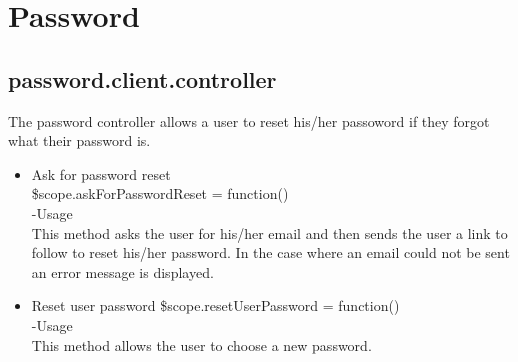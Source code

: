 \documentclass[a4paper,12pt]{article}
\begin{document}
 \section{Password}
 \subsection{password.client.controller}
 The password controller allows a user to reset his/her passoword if they forgot what their password is. 
 \begin{itemize}
\item Ask for password reset\\
  \$scope.askForPasswordReset = function()\\
 -Usage\\
 This method asks the user for his/her email and then sends the user a link to follow to reset his/her password. In the case where an email could not be sent an error message is displayed.
 \item Reset user password
  \$scope.resetUserPassword = function()\\
 -Usage\\
 This method allows the user to choose a new password.
 \end{itemize}
\end{document}
